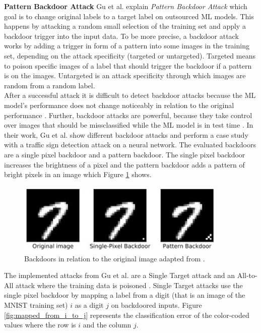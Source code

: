 \textbf{Pattern Backdoor Attack} Gu et al. \cite{DBLP:journals/corr/abs-1708-06733} explain \textit{Pattern Backdoor Attack} which goal is to change original labels to a target label on outsourced ML models. This happens by attacking a random small selection of the training set and apply a backdoor trigger into the input data. To be more precise, a backdoor attack works by adding a trigger in form of a pattern into some images in the training set, depending on the attack specificity (targeted or untargeted). Targeted means to poison specific images of a label that should trigger the backdoor if a pattern is on the images. Untargeted is an attack specificity through which images are random from a random label. \\ After a successful attack it is difficult to detect backdoor attacks because the ML model's performance does not change noticeably in relation to the original performance \cite{DBLP:journals/corr/abs-2106-07925}. Further, backdoor attacks are powerful, because they take control over images that should be missclassified while the ML model is in test time \cite{turner2018clean}. In their work, Gu et al. show different backdoor attacks and perform a case study with a traffic sign detection attack on a neural network. The evaluated backdoors are a single pixel backdoor and a pattern backdoor. The single pixel backdoor increases the brightness of a pixel and the pattern backdoor adds a pattern of bright pixels in an image which Figure \ref{fig:backdoor_pattern} shows.

\begin{figure}[ht!]
  \centering
  \includegraphics[width=10cm]{pictures/backdoor_pattern_bad_net.jpg}
  \caption{Backdoors in relation to the original image adapted from \cite{DBLP:journals/corr/abs-1708-06733}.}
  \label{fig:backdoor_pattern}
\end{figure}

The implemented attacks from Gu et al. are a Single Target attack and an All-to-All attack where the training data is poisoned \cite{DBLP:conf/ccs/HuangJNRT11}. Single Target attacks use the single pixel backdoor by mapping a label from a digit (that is an image of the MNIST \cite{LeCun1995LearningAF} training set) $i$ as a digit $j$ on backdoored inputs. Figure \ref{fig:mapped_from_i_to_j} represents the classification error of the color-coded values where the row is $i$ and the column $j$.


